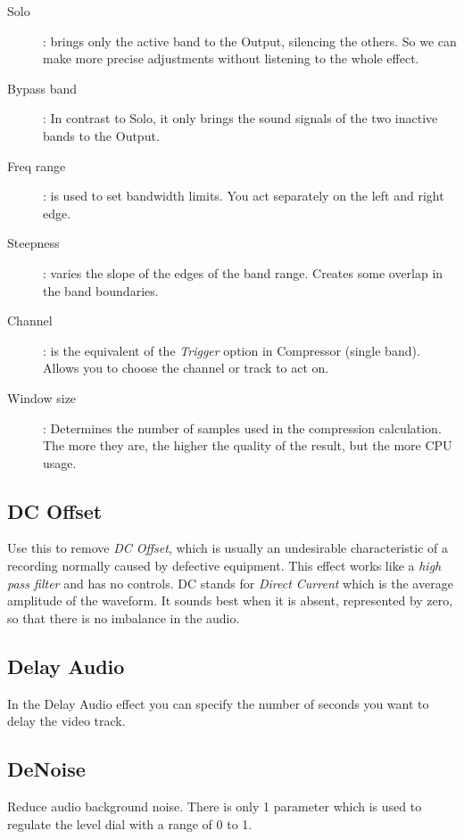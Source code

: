 \begin{description}
	\item[Solo]: brings only the active band to the Output, silencing the others. So we can make more precise adjustments without listening to the whole effect.
	\item[Bypass band]: In contrast to Solo, it only brings the sound signals of the two inactive bands to the Output.
	\item[Freq range]: is used to set bandwidth limits. You act separately on the left and right edge.
	\item[Steepness]: varies the slope of the edges of the band range. Creates some overlap in the band boundaries.
	\item[Channel]: is the equivalent of the \textit{Trigger} option in Compressor (single band). Allows you to choose the channel or track to act on.
	\item[Window size]: Determines the number of samples used in the compression calculation. The more they are, the higher the quality of the result, but the more CPU usage.
\end{description}

\subsection{DC Offset}%
\label{sub:dc_offset}

Use this to remove \textit{DC Offset}, which is usually an undesirable characteristic of a recording normally caused by defective equipment. This effect works like a \textit{high pass filter} and has no controls. DC stands for \textit{Direct Current} which is the average amplitude of the waveform. It sounds best when it is absent, represented by zero, so that there is no imbalance in the audio.

\subsection{Delay Audio}%
\label{sub:delay_audio}

In the Delay Audio effect you can specify the number of seconds you want to delay the video track.

\subsection{DeNoise}%
\label{sub:denoise}

Reduce audio background noise. There is only 1 parameter which is used to regulate the level dial with a range of 0 to 1.

